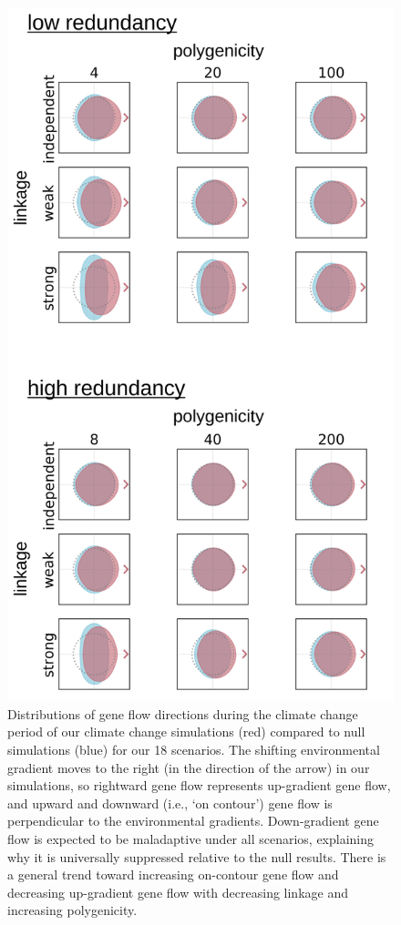 \documentclass[9pt,twocolumn,twoside,lineno]{pnas-new}
\begin{document}
\begin{figure}
\centering
\includegraphics[width=.8\linewidth]{pub/figs_and_stats/FIG_2_gene_flow.jpg}
    \caption{Distributions of gene flow directions during the climate change period of our climate change simulations (red) compared to null simulations (blue) for our 18 scenarios.  The shifting environmental gradient moves to the right (in the direction of the arrow) in our simulations, so rightward gene flow represents up-gradient gene flow, and upward and downward (i.e., `on contour’) gene flow is perpendicular to the environmental gradients. Down-gradient gene flow is expected to be maladaptive under all scenarios, explaining why it is universally suppressed relative to the null results. There is a general trend toward increasing on-contour gene flow and decreasing up-gradient gene flow with decreasing linkage and increasing polygenicity.
}
\label{fig:fig_2}
\end{figure}
\end{document}

